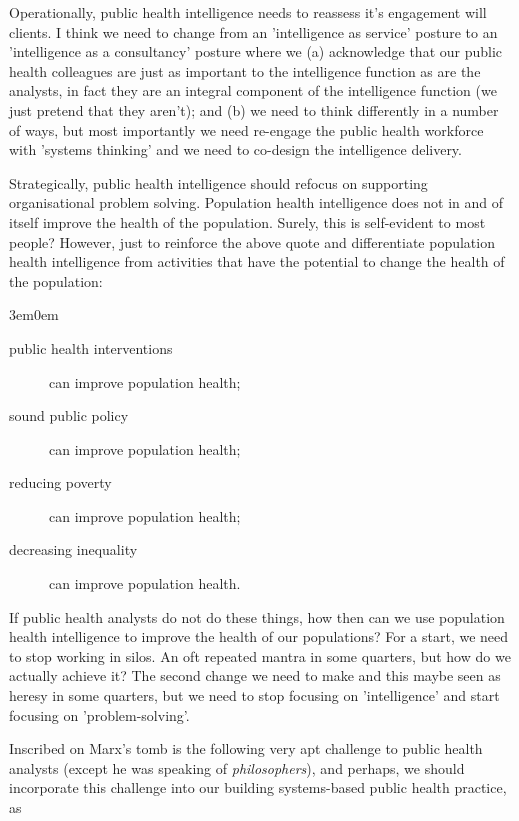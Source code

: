 Operationally, public health intelligence needs to reassess it's engagement will clients. I think we need to change from an 'intelligence as service' posture to an 'intelligence as a consultancy' posture where we (a) acknowledge that our public health colleagues are just as important to the intelligence function as are the analysts, in fact they are an integral component of the intelligence function (we just pretend that they aren't); and (b) we need to think differently in a number of ways, but most importantly we need re-engage the public health workforce with 'systems thinking' and we need to co-design the intelligence delivery.

Strategically, public health intelligence should refocus on supporting organisational problem solving. Population health intelligence does not in and of itself improve the health of the population. Surely, this is self-evident to most people? However, just to reinforce the above quote and differentiate population health intelligence from activities that have the potential to change the health of the population: 

\begin{adjustwidth}{3em}{0em}
	\begin{description}
		\item[public health interventions] can improve population health;
		\item[sound public policy] can improve population health;
		\item[reducing poverty] can improve population health;
		\item[decreasing inequality] can improve population health.
	\end{description}
\end{adjustwidth}

If public health analysts do not do these things, how then can we use population health intelligence to improve the health of our populations? For a start, we need to stop working in silos. An oft repeated mantra in some quarters, but how do we actually achieve it? The second change we need to make and this maybe seen as heresy in some quarters, but we need to stop focusing on 'intelligence' and start focusing on 'problem-solving'.

Inscribed on Marx's tomb is the following very apt challenge to public health analysts (except he was speaking of \emph{philosophers}), and perhaps, we should incorporate this challenge into our building systems-based public health practice, as



